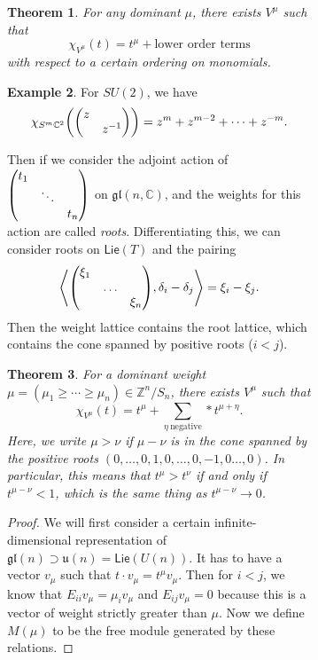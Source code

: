 \documentclass[leqno, openany]{memoir}
\newtheorem{thm}{Theorem}[section]
\theoremstyle{definition}
\newtheorem{exm}[thm]{Example}
\theoremstyle{remark}
\theoremstyle{plain}
\theoremstyle{definition}
\theoremstyle{remark}
\newcommand{\C}{\mathbb{C}}
\newcommand{\Z}{\mathbb{Z}}
\newcommand{\mf}[1]{\mathfrak{#1}}
\newcommand{\ms}[1]{\mathsf{#1}}
\begin{document}
\begin{figure}[H]
\begin{figure}[H]
\begin{thm} For any dominant $\mu$, there exists $V^{\mu}$ such that \[
\chi_{V^{\mu}}(t) = t^{\mu} + \text{lower order terms} \] with respect to a
certain ordering on monomials.  \end{thm}

\begin{exm} For $SU(2)$, we have \[ \chi_{S^m \C^2} \qty( \mqty(\dmat{z,
z^{-1}}) ) = z^m + z^{m-2} + \cdots + z^{-m}. \] \end{exm}

Then if we consider the adjoint action of $\mqty(\dmat{t_1, \ddots, t_n})$ on
$\mf{gl}(n, \C)$, and the weights for this action are called \textit{roots}.
Differentiating this, we can consider roots on $\ms{Lie}(T)$ and the pairing \[
\ev{\mqty(\dmat{\xi_1, \ldots, \xi_n}), \delta_i - \delta_j} = \xi_i - \xi_j.
\] Then the weight lattice contains the root lattice, which contains the cone
spanned by positive roots ($i < j$). 

\begin{thm} For a dominant weight $\mu = (\mu_1 \geq \cdots \geq \mu_n) \in
    \Z^n / S_n$, there exists $V^{\mu}$ such that \[ \chi_{V^{\mu}}(t) =
    t^{\mu} + \sum_{\eta\ \text{negative}} * t^{\mu + \eta}. \] Here, we write
    $\mu > \nu$ if $\mu - \nu$ is in the cone spanned by the positive roots
    $(0, \ldots, 0, 1, 0, \ldots, 0, -1, 0 \ldots, 0)$. In particular, this
    means that $t^{\mu} > t^{\nu}$ if and only if $t^{\mu - \nu} < 1$, which is
    the same thing as $t^{\mu-\nu} \to 0$.  \end{thm}

\begin{proof} We will first consider a certain infinite-dimensional
    representation of $\mf{gl}(n) \supset \mf{u}(n) = \ms{Lie}(U(n))$. It has
    to have a vector $v_{\mu}$ such that $t \cdot v_{\mu} = t^{\mu} v_{\mu}$.
    Then for $i < j$, we know that $E_{ii} v_{\mu} = \mu_i v_{\mu}$ and $E_{ij}
    v_{\mu} = 0$ because this is a vector of weight strictly greater than
    $\mu$. Now we define $M(\mu)$ to be the free module generated by these
    relations.


\end{proof}
\end{figure}
\end{figure}
\end{document}
